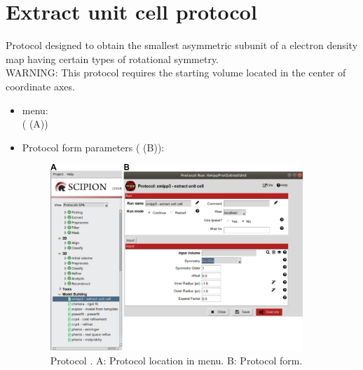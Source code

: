 \section{Extract unit cell protocol}
\label{app:extractUnitCell}%
Protocol designed to obtain the smallest asymmetric subunit of a electron density map having certain types of rotational symmetry.\\
WARNING: This protocol requires the starting volume located in the center of coordinate axes.\\

\begin{itemize}
  \item \scipion menu:\\
   ( (A))\\
  
  \item Protocol form parameters ( (B)):\\
  
  \begin{figure}[H]
    \centering 
    \captionsetup{width=.7\linewidth} 
    \includegraphics[width=0.90\textwidth]{Images_appendix/Fig107.pdf}
    \caption{Protocol . A: Protocol location in \scipion menu. B: Protocol form.}
    \label{fig:app_protocol_extractUnitCell_1}
   \end{figure}
  

\end{itemize}
